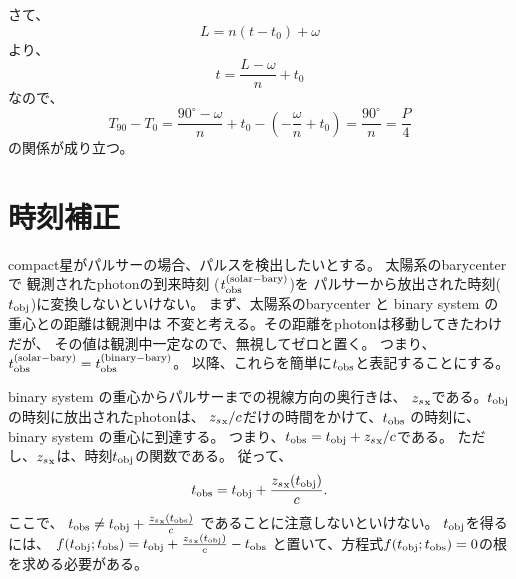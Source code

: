 さて、
\begin{equation}
L = n(t - t_0) + \omega
\end{equation}
より、
\begin{equation}
t = \frac{L - \omega}{n} + t_0
\end{equation}
なので、
\begin{equation}
T_{90} - T_{0} = \frac{90^\circ - \omega}{n} + t_0 -
(- \frac{\omega}{n} + t_0) = \frac{90^\circ}{n} = \frac{P}{4}
\end{equation}
の関係が成り立つ。


\section{時刻補正}

compact星がパルサーの場合、パルスを検出したいとする。
太陽系のbarycenter で 観測されたphotonの到来時刻
($t_{\rm obs}^{\rm (solar-bary)}$)を
パルサーから放出された時刻($t_{\rm obj}$)に変換しないといけない。
まず、太陽系のbarycenter と binary system の重心との距離は観測中は
不変と考える。その距離をphotonは移動してきたわけだが、
その値は観測中一定なので、無視してゼロと置く。
つまり、
$t_{\rm obs}^{\rm (solar-bary)} = t_{\rm obs}^{\rm (binary-bary)}$。
以降、これらを簡単に$t_{\rm obs}$と表記することにする。

binary system の重心からパルサーまでの視線方向の奥行きは、
${z_s}_{\rm x}$である。$t_{\rm obj}$の時刻に放出されたphotonは、
${z_s}_{\rm x}/c$だけの時間をかけて、$t_{\rm obs}$ の時刻に、
binary system の重心に到達する。
つまり、$t_{\rm obs} = t_{\rm obj} + {z_s}_{\rm x}/c$である。
ただし、${z_s}_{\rm x}$は、時刻$t_{\rm obj}$の関数である。
従って、
\begin{equation}
t_{\rm obs} = t_{\rm obj} + \frac{{z_s}_{\rm x}(t_{\rm obj})}{c}.
\end{equation}
ここで、
$t_{\rm obs} \neq t_{\rm obj} + \frac{{z_s}_{\rm x}(t_{\rm obs})}{c}$
であることに注意しないといけない。
$t_{\rm obj}$を得るには、
$f(t_{\rm obj}; t_{\rm obs}) =
t_{\rm obj} + \frac{{z_s}_{\rm x}(t_{\rm obj})}{c} - t_{\rm obs}$
と置いて、方程式$f(t_{\rm obj}; t_{\rm obs}) = 0$の根を求める必要がある。



